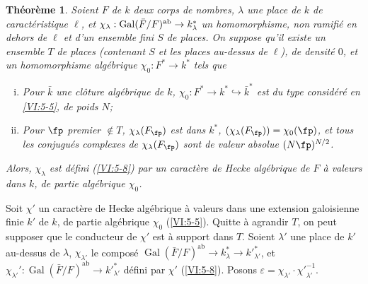 \documentclass[oneside]{book}
\DeclareMathOperator{\gal}{Gal}
\theoremstyle{sga-source}
\theoremstyle{sga-source-dash}
\theoremstyle{sga-source-dotdash}
\theoremstyle{sga-source-number-note-dash}
\theoremstyle{sga-source-note-number-dotdash}
\theoremstyle{sga-source-example-dotdash}
\theoremstyle{sga-source-inline-number}
\theoremstyle{sga-source-bare-number}
\theoremstyle{sga-source}
\newtheorem{theorem_}[subsection]{Théorème}
\newcommand{\PrintPage}[1]{}\newcommand{\MathPage}[1]{}\newcommand{\PrintCite}[2]{#1}\newcommand{\var}[3]{#1}
\begin{document}
\begin{theorem_}\label{VI:5-10}
\var{Soient $F$ de $k$}{Soient $F$ et $k$}{S45-SOL-0883} deux corps de nombres, $\lambda$ une place de $k$ de 
caractéristique $\ell$, et 
$\chi_\lambda:\gal(\bar F/F)^\textnormal{ab}\to k_\lambda^\ast$ un 
homomorphisme, non ramifié en dehors de $\ell$ et d'un ensemble fini $S$ de 
places. On suppose qu'il existe un ensemble $T$ de places (contenant $S$ et les 
places au-dessus de $\ell$), de densité $0$, et un homomorphisme algébrique 
$\chi_0:F^\ast \to k^\ast$ tels que 
\begin{enumerate}[(i)]
  \item Pour $\bar k$ une clôture algébrique de $k$, 
    $\chi_0:F^\ast \to k^\ast \hookrightarrow \bar k^\ast$ est du type 
    considéré en \ref{VI:5-5}, de poids $N$; 
  \PrintPage{212}
\item Pour $\fp$ premier $\notin T$, $\chi_\lambda(F_\fp)$ est dans 
    $k^\ast$, $(\chi_\lambda(F_\fp))=\chi_0(\fp)$, et tous les conjugués 
    complexes de $\chi_\lambda(F_\fp)$ sont de valeur absolue $(N \fp)^{N/2}$. 
\end{enumerate}

Alors, $\chi_\lambda$ est défini (\ref{VI:5-8}) par un caractère de Hecke 
algébrique de $F$ à valeurs dans $k$, de partie algébrique $\chi_0$. 
\end{theorem_}

Soit $\chi'$ un caractère de Hecke algébrique à valeurs dans une 
extension galoisienne finie $k'$ de $k$, de partie algébrique $\chi_0$ 
(\ref{VI:5-5}). Quitte à agrandir $T$, on peut supposer que le conducteur de 
$\chi'$ est à support dans $T$. Soient $\lambda'$ une place de $k'$ au-dessus 
de $\lambda$, $\chi_{\lambda'}$ le composé 
$\gal(\bar F/F)^\text{ab}\to k_\lambda^\ast \to {k'}_{\lambda'}^\ast$, et 
$\chi_{\lambda'}':\gal(\bar F/F)^\text{ab}\to {k'}_{\lambda'}^\ast$ défini 
par $\chi'$ (\ref{VI:5-8}). Posons 
$\varepsilon = \chi_{\lambda'} \cdot {\chi'}_{\lambda'}^{-1}$. 
\end{document}
